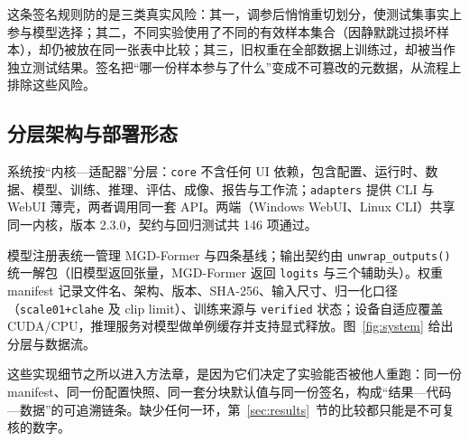 这条签名规则防的是三类真实风险：其一，调参后悄悄重切划分，使测试集事实上参与模型选择；其二，不同实验使用了不同的有效样本集合（因静默跳过损坏样本），却仍被放在同一张表中比较；其三，旧权重在全部数据上训练过，却被当作独立测试结果。签名把“哪一份样本参与了什么”变成不可篡改的元数据，从流程上排除这些风险。

\subsection{分层架构与部署形态}\label{sec:architecture}

系统按“内核—适配器”分层：\texttt{core} 不含任何 UI 依赖，包含配置、运行时、数据、模型、训练、推理、评估、成像、报告与工作流；\texttt{adapters} 提供 CLI 与 WebUI 薄壳，两者调用同一套 API。两端（Windows WebUI、Linux CLI）共享同一内核，版本 2.3.0，契约与回归测试共 146 项通过。

模型注册表统一管理 MGD-Former 与四条基线；输出契约由 \texttt{unwrap\_outputs()} 统一解包（旧模型返回张量，MGD-Former 返回 \texttt{logits} 与三个辅助头）。权重 manifest 记录文件名、架构、版本、SHA-256、输入尺寸、归一化口径（\texttt{scale01+clahe} 及 clip limit）、训练来源与 \texttt{verified} 状态；设备自适应覆盖 CUDA/CPU，推理服务对模型做单例缓存并支持显式释放。图~\ref{fig:system} 给出分层与数据流。



这些实现细节之所以进入方法章，是因为它们决定了实验能否被他人重跑：同一份 manifest、同一份配置快照、同一套分块默认值与同一份签名，构成“结果—代码—数据”的可追溯链条。缺少任何一环，第~\ref{sec:results}~节的比较都只能是不可复核的数字。
